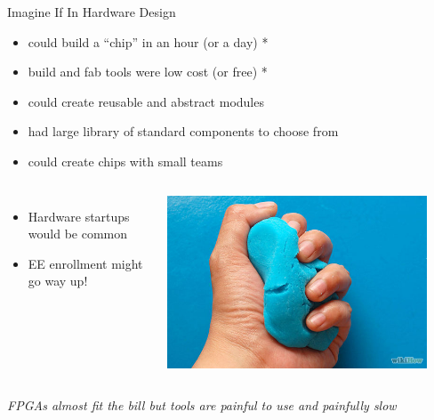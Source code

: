 \documentclass[xcolor=pdflatex,dvipsnames,table]{beamer}
\begin{document}
\begin{frame}[fragile]{Imagine If In Hardware Design}
\begin{itemize}
\item could build a ``chip'' in an hour (or a day) *
\item build and fab tools were low cost (or free) *
\item could create reusable and abstract modules
\item had large library of standard components to choose from
\item could create chips with small teams
\end{itemize}
\begin{columns}
\begin{itemize}
\item {\color{red}Hardware startups would be common}
\item {\color{red}EE enrollment might go way up!}
\end{itemize}
\begin{center}
\includegraphics[width=0.9\textwidth]{figs/clay-power.jpg}
\end{center}
\end{columns}
\vspace{1cm}
{\it\small * FPGAs almost fit the bill but tools are painful to use and painfully slow}
\end{frame}
\end{document}

